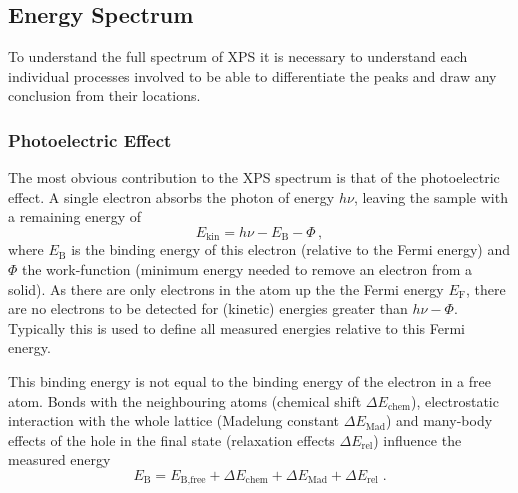 \documentclass[a4paper]{scrartcl}
\numberwithin{equation}{section}
\numberwithin{figure}{section}
\numberwithin{table}{section}
\newcommand{\eq}[2]{\begin{equation}#1\label{#2}\end{equation}}
\begin{document}
\subsection{Energy Spectrum}
To understand the full spectrum of XPS it is necessary to understand each individual processes involved to be able to differentiate the peaks and draw any conclusion from their locations.


\subsubsection{Photoelectric Effect}
The most obvious contribution to the XPS spectrum is that of the photoelectric effect. A single electron absorbs the photon of energy $h\nu$, leaving the sample with a remaining energy of
\eq{E_\text{kin} = h\nu - E_\text{B} - \Phi \, ,}{}
where $E_\text{B}$ is the binding energy of this electron (relative to the Fermi energy) and $\Phi$ the work-function (minimum energy needed to remove an electron from a solid).
As there are only electrons in the atom up the the Fermi energy $E_\text{F}$, there are no electrons to be detected for (kinetic) energies greater than $h\nu -\Phi$. Typically this is used to define all measured energies relative to this Fermi energy.

This binding energy is not equal to the binding energy of the electron in a free atom. Bonds with the neighbouring atoms (chemical shift $\Delta E_\text{chem}$), electrostatic interaction with the whole lattice (Madelung constant $\Delta E_\text{Mad}$) and many-body effects of the hole in the final state (relaxation effects $\Delta E_\text{rel}$) influence the measured energy
\eq{E_\text{B}=E_\text{B,free} + \Delta E_\text{chem} + \Delta E_\text{Mad} + \Delta E_\text{rel} \; . }{}
\end{document}
